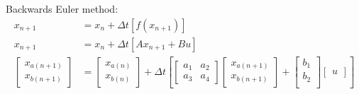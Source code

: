 \documentclass[11pt]{article}
\begin{document}
Backwards Euler method:
\begin{subequations}
  \begin{align}
    x_{n+1} &= x_n +\Delta t \left[f\left(x_{n+1}\right)\right] \\
    x_{n+1} &= x_n +\Delta t \left[Ax_{n+1}+Bu\right] \\
    \begin{bmatrix}
      x_{a(n+1)} \\
      x_{b(n+1)}
    \end{bmatrix} &=
    \begin{bmatrix}
      x_{a(n)} \\
      x_{b(n)}
    \end{bmatrix} +
    \Delta t \left[
    \begin{bmatrix}
      a_1 & a_2 \\
      a_3 & a_4
    \end{bmatrix}
    \begin{bmatrix}
      x_{a(n+1)} \\
      x_{b(n+1)}
    \end{bmatrix} +
    \begin{bmatrix}
      b_1 \\
      b_2 \\
    \end{bmatrix}
    \begin{bmatrix}
      u
    \end{bmatrix}
    \right]
  \end{align}
\end{subequations}
\end{document}
